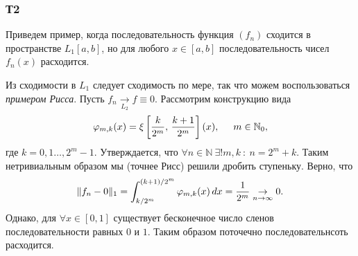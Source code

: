 \subsubsection*{Т2}


Приведем пример, когда последовательность функция $(f_n)$ сходится в пространстве $L_1[a, b]$, но для любого $x \in[a, b]$ последовательность чисел $f_n(x)$ расходится. 

Из сходимости в $L_1$ следует сходимость по мере, так что можем воспользоваться \textit{примером Рисса}. Пусть $f_n \underset{L_2}{\to}  f \equiv 0 $. Рассмотрим конструкцию вида
\begin{equation*}
    \varphi_{m,k} (x) = \xi\left[\frac{k}{2^m},\, \frac{k+1}{2^m}\right](x),
    \hspace{5 mm} 
    m \in \mathbb{N}_0,
\end{equation*}
где $k=0,1\ldots,2^{m}-1$. Утверждается, что $\forall n \in \mathbb{N} \ \exists ! m, k \ \colon  \ n = 2^m + k$. Таким нетривиальным образом мы (точнее Рисс) решили дробить ступеньку. Верно, что
\begin{equation*}
    \|f_n-0\|_1 = \int_{k/2^m}^{(k+1)/2^m} \varphi_{m ,k} (x) \, d x = \frac{1}{2^m} \underset{n\to\infty}{\to} 0.
\end{equation*}
Однако, для $\forall x \in[0, 1]$ существует бесконечное число сленов последовательности равных $0$ и $1$. Таким образом поточечно последовательнсоть расходится.

